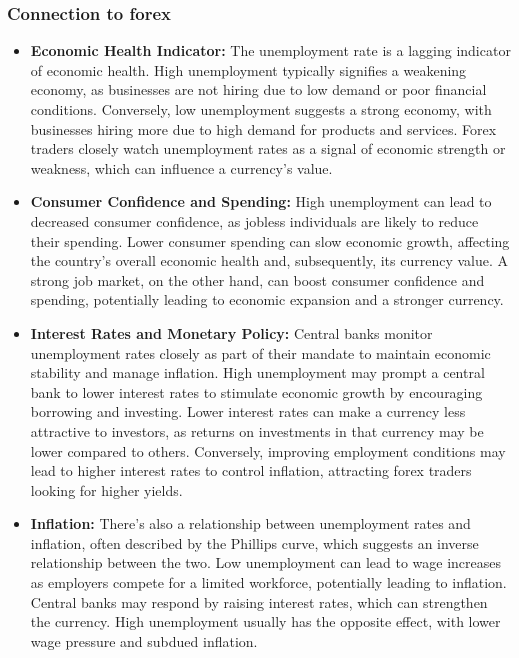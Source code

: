 \documentclass{report}
\begin{document}
     \subsubsection{Connection to forex}
     \bigbreak \noindent 
     \begin{itemize}
         \item \textbf{Economic Health Indicator:} The unemployment rate is a lagging indicator of economic health. High unemployment typically signifies a weakening economy, as businesses are not hiring due to low demand or poor financial conditions. Conversely, low unemployment suggests a strong economy, with businesses hiring more due to high demand for products and services. Forex traders closely watch unemployment rates as a signal of economic strength or weakness, which can influence a currency's value.
         \item \textbf{Consumer Confidence and Spending:} High unemployment can lead to decreased consumer confidence, as jobless individuals are likely to reduce their spending. Lower consumer spending can slow economic growth, affecting the country's overall economic health and, subsequently, its currency value. A strong job market, on the other hand, can boost consumer confidence and spending, potentially leading to economic expansion and a stronger currency.
         \item \textbf{Interest Rates and Monetary Policy:} Central banks monitor unemployment rates closely as part of their mandate to maintain economic stability and manage inflation. High unemployment may prompt a central bank to lower interest rates to stimulate economic growth by encouraging borrowing and investing. Lower interest rates can make a currency less attractive to investors, as returns on investments in that currency may be lower compared to others. Conversely, improving employment conditions may lead to higher interest rates to control inflation, attracting forex traders looking for higher yields.
         \item \textbf{Inflation:} There's also a relationship between unemployment rates and inflation, often described by the Phillips curve, which suggests an inverse relationship between the two. Low unemployment can lead to wage increases as employers compete for a limited workforce, potentially leading to inflation. Central banks may respond by raising interest rates, which can strengthen the currency. High unemployment usually has the opposite effect, with lower wage pressure and subdued inflation.
     \end{itemize}
     \bigbreak \noindent 
\end{document}
